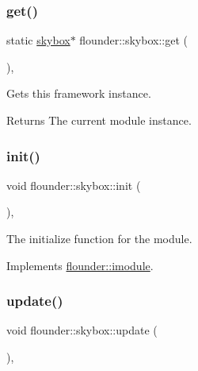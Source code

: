 \subsubsection{\texorpdfstring{get()}{get()}}
{\footnotesize\ttfamily static \hyperlink{classflounder_1_1skybox}{skybox}$\ast$ flounder\+::skybox\+::get (\begin{DoxyParamCaption}{ }\end{DoxyParamCaption})\hspace{0.3cm}{\ttfamily [inline]}, {\ttfamily [static]}}



Gets this framework instance. 

\begin{DoxyReturn}{Returns}
The current module instance. 
\end{DoxyReturn}
\mbox{\label{classflounder_1_1skybox_ad298f30a9e35657726bc8043a687cab7}} 
\subsubsection{\texorpdfstring{init()}{init()}}
{\footnotesize\ttfamily void flounder\+::skybox\+::init (\begin{DoxyParamCaption}{ }\end{DoxyParamCaption})\hspace{0.3cm}{\ttfamily [override]}, {\ttfamily [virtual]}}



The initialize function for the module. 



Implements \hyperlink{classflounder_1_1imodule_a1725ef346952884d0741de61aba1e0c7}{flounder\+::imodule}.

\mbox{\label{classflounder_1_1skybox_a9c961cf6d878f40f0294905415981234}} 
\subsubsection{\texorpdfstring{update()}{update()}}
{\footnotesize\ttfamily void flounder\+::skybox\+::update (\begin{DoxyParamCaption}{ }\end{DoxyParamCaption})\hspace{0.3cm}{\ttfamily [override]}, {\ttfamily [virtual]}}



